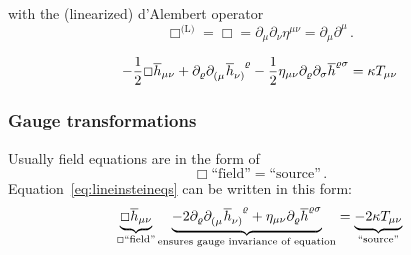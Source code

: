 

with the (linearized) d'Alembert operator
\begin{equation}
    \Box^{\text{(L)}} = \Box = \partial_\mu\partial_\nu
    \eta^{\mu\nu}=\partial_\mu\partial^\mu\,.
\end{equation}
\begin{definition}
    \begin{equation}
        \label{eq:lineinsteineqs}
        -\frac{1}{2} \Box \overline{h}_{\mu\nu} + \partial_\varrho \tensor{\partial}{_(_\mu}\tensor{\overline{h}}{_\nu_)^\varrho}
        - \frac{1}{2} \eta_{\mu\nu}\partial_\varrho\partial_\sigma \overline{h}^{\varrho\sigma} = \kappa T_{\mu\nu}
    \end{equation}
\end{definition}

\subsubsection{Gauge transformations}
Usually field equations are in the form of
\begin{equation}
    \Box \text{``field''} = \text{``source''}\,.
\end{equation}
Equation~\eqref{eq:lineinsteineqs} can be written in this form:
\begin{equation}
    \underbrace{\Box \overline{h}_{\mu\nu}}_{\Box\text{``field''}}
    \underbrace{- 2 \partial_\varrho \tensor{\partial}{_(_\mu} \tensor{\overline{h}}{_\nu_)^\varrho}
    + \eta_{\mu\nu}\partial_\varrho \overline{h}^{\varrho\sigma}}_{\text{ensures gauge invariance of equation}}
    = \underbrace{-2\kappa T_{\mu\nu}}_{\text{``source''}}
\end{equation}

